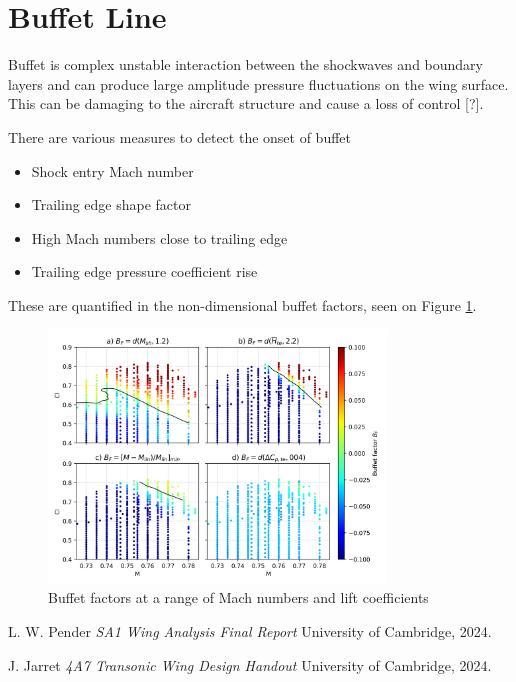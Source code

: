 \documentclass[11pt]{article}
\begin{document}
\section{Buffet Line}

Buffet is complex unstable interaction between the shockwaves and boundary layers and can produce large amplitude pressure fluctuations on the wing surface.
This can be damaging to the aircraft structure and cause a loss of control [?].

There are various measures to detect the onset of buffet
\begin{itemize}
    \item Shock entry Mach number
    \item Trailing edge shape factor
    \item High Mach numbers close to trailing edge
    \item Trailing edge pressure coefficient rise
\end{itemize}
These are quantified in the non-dimensional buffet factors, seen on Figure \ref{fig:buffet_classification}.

\begin{figure}[H]
    \centering
    \includegraphics[width=0.8\textwidth]{figures/buffet_classification.png}
    \caption{Buffet factors at a range of Mach numbers and lift coefficients}
    \label{fig:buffet_classification}
\end{figure}

\begin{thebibliography}{9}


      L. W. Pender
      \emph{SA1 Wing Analysis Final Report}
      University of Cambridge,
      2024.
    
      J. Jarret
      \emph{4A7 Transonic Wing Design Handout}
      University of Cambridge,
      2024.
    
\end{thebibliography}
\end{document}
